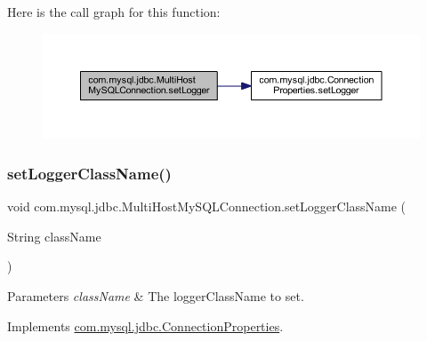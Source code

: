 Here is the call graph for this function\+:
\nopagebreak
\begin{figure}[H]
\begin{center}
\leavevmode
\includegraphics[width=350pt]{classcom_1_1mysql_1_1jdbc_1_1_multi_host_my_s_q_l_connection_a8ff36862180722f5f43542808c8764f0_cgraph}
\end{center}
\end{figure}
\mbox{\label{classcom_1_1mysql_1_1jdbc_1_1_multi_host_my_s_q_l_connection_a2d01c838ac3a65f71743aaa28f220ed0}} 
\subsubsection{\texorpdfstring{set\+Logger\+Class\+Name()}{setLoggerClassName()}}
{\footnotesize\ttfamily void com.\+mysql.\+jdbc.\+Multi\+Host\+My\+S\+Q\+L\+Connection.\+set\+Logger\+Class\+Name (\begin{DoxyParamCaption}\item[{String}]{class\+Name }\end{DoxyParamCaption})}


\begin{DoxyParams}{Parameters}
{\em class\+Name} & The logger\+Class\+Name to set. \\
\hline
\end{DoxyParams}


Implements \mbox{\hyperlink{interfacecom_1_1mysql_1_1jdbc_1_1_connection_properties_a4bde3c5c986dba54cf5ed53038cb7181}{com.\+mysql.\+jdbc.\+Connection\+Properties}}.

